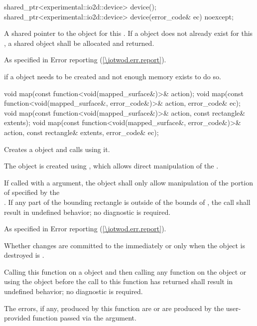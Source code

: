 \begin{itemdecl}
shared_ptr<experimental::io2d::device> device();
shared_ptr<experimental::io2d::device> device(error_code& ec) noexcept;
\end{itemdecl}
\begin{itemdescr}
\pnum
\returns
A shared pointer to the  object for this . If a  object does not already exist for this , a shared  object shall be allocated and returned.

\pnum
\throws
As specified in Error reporting (\ref{\iotwod.err.report}).

\pnum
\errors
{} if a  object needs to be created and not enough memory exists to do so.
\end{itemdescr}

\begin{itemdecl}
void map(const function<void(mapped_surface&)>& action);
void map(const function<void(mapped_surface&, error_code&)>& action, error_code& ec);
void map(const function<void(mapped_surface&)>& action, const rectangle& extents);
void map(const function<void(mapped_surface&, error_code&)>& action,
  const rectangle& extents, error_code& ec);
\end{itemdecl}
\begin{itemdescr}
\pnum
\effects
Creates a  object and calls  using it.

\pnum
The  object is created using , which allows direct manipulation of the \underlyingsurface.

\pnum
If called with a  argument, the  object shall only allow manipulation of the portion of  specified by the  \\
. If any part of the bounding rectangle is outside of the bounds of , the call shall result in undefined behavior; no diagnostic is required.

\pnum
\throws
As specified in Error reporting (\ref{\iotwod.err.report}).

\pnum
\remarks
Whether changes are committed to the \underlyingsurface immediately or only when the  object is destroyed is \unspecnorm.

\pnum
Calling this function on a  object and then calling any function on the  object or using the  object before the call to this function has returned shall result in undefined behavior; no diagnostic is required.

\pnum
\errors
The errors, if any, produced by this function are  or are produced by the user-provided function passed via the  argument.
\end{itemdescr}


